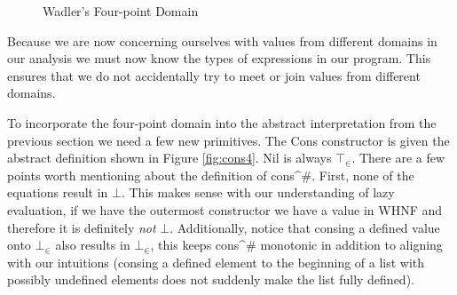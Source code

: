 \begin{figure}
\centering
{}
\caption{Wadler's Four-point Domain}
\label{fig:listDomain}
\end{figure}

Because we are now concerning ourselves with values from different domains in
our analysis we must now know the types of expressions in our program. This
ensures that we do not accidentally try to \<meet\> or \<join\> values from
different domains. 

To incorporate the four-point domain into the abstract interpretation from the
previous section we need a few new primitives. The \<Cons\> constructor is
given the abstract definition shown in Figure \ref{fig:cons4}. \<Nil\> is
always $\top_{\in}$.  There are a few points worth mentioning about the
definition of \<cons^{\#}\>.  First, none of the equations result in $\bot$.
This makes sense with our understanding of lazy evaluation, if we have the
outermost constructor we have a value in WHNF and therefore it is definitely
\emph{not} $\bot$. Additionally, notice that \<cons\>ing a defined value onto
$\bot_{\in}$ also results in $\bot_{\in}$, this keeps \<cons^{\#}\> monotonic
in addition to aligning with our intuitions (\<cons\>ing a defined element to
the beginning of a list with possibly undefined elements does not suddenly make
the list fully defined). 


